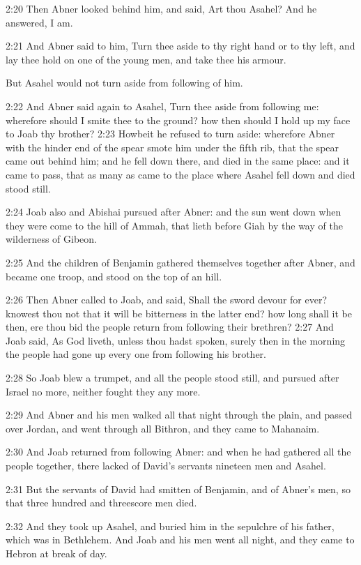 2:20 Then Abner looked behind him, and said, Art thou Asahel? And he
answered, I am.

2:21 And Abner said to him, Turn thee aside to thy right hand or to
thy left, and lay thee hold on one of the young men, and take thee his
armour.

But Asahel would not turn aside from following of him.

2:22 And Abner said again to Asahel, Turn thee aside from following
me: wherefore should I smite thee to the ground? how then should I
hold up my face to Joab thy brother?  2:23 Howbeit he refused to turn
aside: wherefore Abner with the hinder end of the spear smote him
under the fifth rib, that the spear came out behind him; and he fell
down there, and died in the same place: and it came to pass, that as
many as came to the place where Asahel fell down and died stood still.

2:24 Joab also and Abishai pursued after Abner: and the sun went down
when they were come to the hill of Ammah, that lieth before Giah by
the way of the wilderness of Gibeon.

2:25 And the children of Benjamin gathered themselves together after
Abner, and became one troop, and stood on the top of an hill.

2:26 Then Abner called to Joab, and said, Shall the sword devour for
ever?  knowest thou not that it will be bitterness in the latter end?
how long shall it be then, ere thou bid the people return from
following their brethren?  2:27 And Joab said, As God liveth, unless
thou hadst spoken, surely then in the morning the people had gone up
every one from following his brother.

2:28 So Joab blew a trumpet, and all the people stood still, and
pursued after Israel no more, neither fought they any more.

2:29 And Abner and his men walked all that night through the plain,
and passed over Jordan, and went through all Bithron, and they came to
Mahanaim.

2:30 And Joab returned from following Abner: and when he had gathered
all the people together, there lacked of David's servants nineteen men
and Asahel.

2:31 But the servants of David had smitten of Benjamin, and of Abner's
men, so that three hundred and threescore men died.

2:32 And they took up Asahel, and buried him in the sepulchre of his
father, which was in Bethlehem. And Joab and his men went all night,
and they came to Hebron at break of day.

